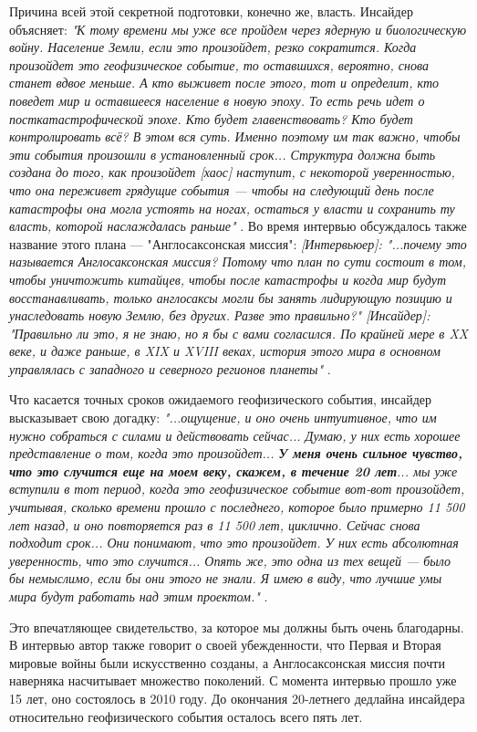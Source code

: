\documentclass[10pt,twocolumn,letterpaper]{article}
\begin{document}
Причина всей этой секретной подготовки, конечно же, власть. Инсайдер объясняет: \textit{"К тому времени мы уже все пройдем через ядерную и биологическую войну. Население Земли, если это произойдет, резко сократится. Когда произойдет это геофизическое событие, то оставшихся, вероятно, снова станет вдвое меньше. А кто выживет после этого, тот и определит, кто поведет мир и оставшееся население в новую эпоху. То есть речь идет о посткатастрофической эпохе. Кто будет главенствовать? Кто будет контролировать всё? В этом вся суть. Именно поэтому им так важно, чтобы эти события произошли в установленный срок... Структура должна быть создана до того, как произойдет [хаос] наступит, с некоторой уверенностью, что она переживет грядущие события — чтобы на следующий день после катастрофы она могла устоять на ногах, остаться у власти и сохранить ту власть, которой наслаждалась раньше"} \cite{4}. Во время интервью обсуждалось также название этого плана — "Англосаксонская миссия": \textit{[Интервьюер]: "...почему это называется Англосаксонская миссия? Потому что план по сути состоит в том, чтобы уничтожить китайцев, чтобы после катастрофы и когда мир будут восстанавливать, только англосаксы могли бы занять лидирующую позицию и унаследовать новую Землю, без других. Разве это правильно?" [Инсайдер]: "Правильно ли это, я не знаю, но я бы с вами согласился. По крайней мере в XX веке, и даже раньше, в XIX и XVIII веках, история этого мира в основном управлялась с западного и северного регионов планеты"} \cite{4}.

Что касается точных сроков ожидаемого геофизического события, инсайдер высказывает свою догадку: \textit{"...ощущение, и оно очень интуитивное, что им нужно собраться с силами и действовать сейчас... Думаю, у них есть хорошее представление о том, когда это произойдет... \textbf{У меня очень сильное чувство, что это случится еще на моем веку, скажем, в течение 20 лет}... мы уже вступили в тот период, когда это геофизическое событие вот-вот произойдет, учитывая, сколько времени прошло с последнего, которое было примерно 11 500 лет назад, и оно повторяется раз в 11 500 лет, циклично. Сейчас снова подходит срок... Они понимают, что это произойдет. У них есть абсолютная уверенность, что это случится... Опять же, это одна из тех вещей — было бы немыслимо, если бы они этого не знали. Я имею в виду, что лучшие умы мира будут работать над этим проектом."} \cite{4}.

Это впечатляющее свидетельство, за которое мы должны быть очень благодарны. В интервью автор также говорит о своей убежденности, что Первая и Вторая мировые войны были искусственно созданы, а Англосаксонская миссия почти наверняка насчитывает множество поколений. С момента интервью прошло уже 15 лет, оно состоялось в 2010 году. До окончания 20-летнего дедлайна инсайдера относительно геофизического события осталось всего пять лет.
\end{document}
